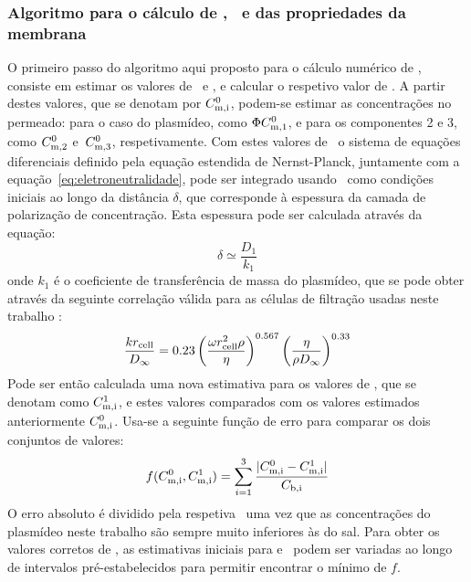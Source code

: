 \subsubsection{Algoritmo para o cálculo de \concpi, \concbi\ e das propriedades da membrana}
%
O primeiro passo do algoritmo aqui proposto para o cálculo numérico de \concpi, consiste em estimar os valores de \concmum\ e \concmdois, e calcular o respetivo valor de \concmtres. A partir destes valores, que se denotam por $C_{\mathrm{m,i}}^{0}$, podem-se estimar as concentrações no permeado: para o caso do plasmídeo, como $\Phi C_{\mathrm{m,1}}^{0}$, e para os componentes 2 e 3, como $C_{\mathrm{m,2}}^{0}$ e\ $C_{\mathrm{m,3}}^{0}$, respetivamente. Com estes valores de \concpi\ o sistema de equações diferenciais definido pela equação estendida de Nernst-Planck, juntamente com a equação~\ref{eq:eletroneutralidade}, pode ser integrado usando \concbi\ como condições iniciais ao longo da distância $\delta$, que corresponde à espessura da camada de polarização de concentração. Esta espessura pode ser calculada através da equação:
\begin{equation}
\label{eq:delta}
\delta\simeq\frac{D_{1}}{k_{1}}
\end{equation}
onde $k_{1}$ é o coeficiente de transferência de massa do plasmídeo, que se pode obter através da seguinte correlação válida para as células de filtração usadas neste trabalho \cite{opong,bowen97}:
%
%
\begin{equation}
\label{eq:opong}
\frac{kr_{\mathrm{cell}}}{D_{\infty}}=0.23\left(\frac{\omega r^{2}_{\mathrm{cell}}\rho}{\eta}\right)^{0.567}\left(\frac{\eta}{\rho D_{\infty}}\right)^{0.33}  
\end{equation}
Pode ser então calculada uma nova estimativa para os valores de \concmi, que se denotam como $C_{\mathrm{m,i}}^{1}$, e estes valores comparados com os valores estimados anteriormente $C_{\mathrm{m,i}}^{0}$. Usa-se a seguinte função de erro para comparar os dois conjuntos de valores:
%
\begin{equation}
\label{eq:erromeu2}
f(C_{\mathrm{m,i}}^{0},C_{\mathrm{m,i}}^{1})=\sum_{i=1}^{3}\frac{|C_{\mathrm{m,i}}^{0}-C_{\mathrm{m,i}}^{1}|}{C_{\mathrm{b,i}}}
\end{equation}
O erro absoluto é dividido pela respetiva \concbi\ uma vez que as concentrações do plasmídeo neste trabalho são sempre muito inferiores às do sal. Para obter os valores corretos de \concmi, as estimativas iniciais para \concmum e \concmdois\ podem ser variadas ao longo de intervalos pré-estabelecidos para permitir encontrar o mínimo de $f$. 

